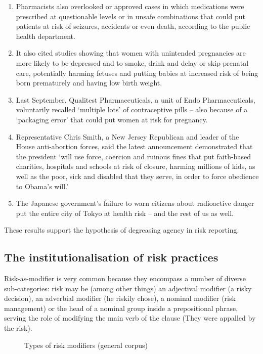 %
\begin{enumerate} [before=\color{black}\ttfamily] \setlength\itemsep{0em} \small
\item Pharmacists also overlooked or approved cases in which medications were prescribed at questionable levels or in unsafe combinations that could put patients at risk of seizures, accidents or even death, according to the public health department.
\item It also cited studies showing that women with unintended pregnancies are more likely to be depressed and to smoke, drink and delay or skip prenatal care, potentially harming fetuses and putting babies at increased risk of being born prematurely and having low birth weight.
\item Last September, Qualitest Pharmaceuticals, a unit of Endo Pharmaceuticals, voluntarily recalled `multiple lots' of contraceptive pills -- also because of a `packaging error' that could put women at risk for pregnancy.
\item Representative Chris Smith, a New Jersey Republican and leader of the House anti-abortion forces, said the latest announcement demonstrated that the president `will use force, coercion and ruinous fines that put faith-based charities, hospitals and schools at risk of closure, harming millions of kids, as well as the poor, sick and disabled that they serve, in order to force obedience to Obama's will.'
\item The Japanese government's failure to warn citizens about radioactive danger put the entire city of Tokyo at health risk -- and the rest of us as well.
\end{enumerate}
%
These results support the hypothesis of degreasing agency in risk reporting.
%
\subsection{The institutionalisation of risk practices}

Risk-as-modifier is very common because they encompass a number of diverse sub-categories: risk may be (among other things) an adjectival modifier (a risky decision), an adverbial modifier (he riskily chose), a nominal modifier (risk management) or the head of a nominal group inside a prepositional phrase, serving the role of modifying the main verb of the clause (They were appalled by the risk). 

\begin{figure}[htb!]
\centering
{}
\caption{Types of risk modifiers (general corpus)}
\end{figure}

